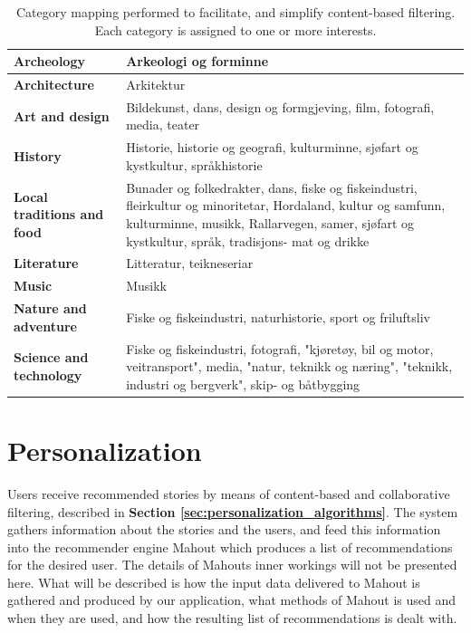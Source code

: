 \begin{table}[!h]
	\begin{center}
		\caption{Category mapping performed to facilitate, and simplify content-based filtering. Each category is assigned to one or more interests.}
		\label{Tab:categorymapping}
		\begin{tabular}{ | p{5cm} | p{12cm}|}
			\hline
			\textbf{Archeology} & Arkeologi og forminne \\ \hline
			\textbf{Architecture} & Arkitektur \\ \hline
			\textbf{Art and design} & Bildekunst, dans, design og formgjeving, film, fotografi, media, teater \\ \hline
			\textbf{History} & Historie, historie og geografi, kulturminne, sjøfart og kystkultur, språkhistorie \\ \hline
			\textbf{Local traditions and food} & Bunader og folkedrakter, dans, fiske og fiskeindustri, fleirkultur og minoritetar, Hordaland, kultur og samfunn, kulturminne, musikk, Rallarvegen, samer, sjøfart og kystkultur, språk, tradisjons- mat og drikke \\ \hline
			\textbf{Literature } & Litteratur, teikneseriar \\ \hline
			\textbf{Music} & Musikk \\ \hline
			\textbf{Nature and adventure} & Fiske og fiskeindustri, naturhistorie, sport og friluftsliv \\ \hline
			\textbf{Science and technology} & Fiske og fiskeindustri, fotografi, "kjøretøy, bil og motor, veitransport", media, "natur, teknikk og næring", "teknikk, industri og bergverk", skip- og båtbygging \\ \hline
		\end{tabular}
	\end{center}
\end{table}

\section{Personalization}
\label{sec:personalization_how}

Users receive recommended stories by means of content-based and collaborative filtering, described in \textbf{Section \ref{sec:personalization_algorithms}}. The system gathers information about the stories and the users, and feed this information into the recommender engine Mahout which produces a list of recommendations for the desired user. The details of Mahouts inner workings will not be presented here. What will be described is how the input data delivered to Mahout is gathered and produced by our application, what methods of Mahout is used and when they are used, and how the resulting list of recommendations is dealt with.\newline

